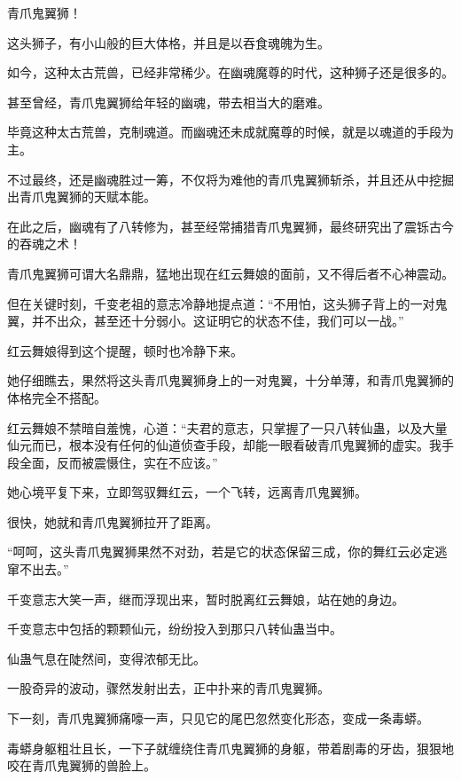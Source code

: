 
\begin{this_body}



青爪鬼翼狮！

这头狮子，有小山般的巨大体格，并且是以吞食魂魄为生。

如今，这种太古荒兽，已经非常稀少。在幽魂魔尊的时代，这种狮子还是很多的。

甚至曾经，青爪鬼翼狮给年轻的幽魂，带去相当大的磨难。

毕竟这种太古荒兽，克制魂道。而幽魂还未成就魔尊的时候，就是以魂道的手段为主。

不过最终，还是幽魂胜过一筹，不仅将为难他的青爪鬼翼狮斩杀，并且还从中挖掘出青爪鬼翼狮的天赋本能。

在此之后，幽魂有了八转修为，甚至经常捕猎青爪鬼翼狮，最终研究出了震铄古今的吞魂之术！

青爪鬼翼狮可谓大名鼎鼎，猛地出现在红云舞娘的面前，又不得后者不心神震动。

但在关键时刻，千变老祖的意志冷静地提点道：“不用怕，这头狮子背上的一对鬼翼，并不出众，甚至还十分弱小。这证明它的状态不佳，我们可以一战。”

红云舞娘得到这个提醒，顿时也冷静下来。

她仔细瞧去，果然将这头青爪鬼翼狮身上的一对鬼翼，十分单薄，和青爪鬼翼狮的体格完全不搭配。

红云舞娘不禁暗自羞愧，心道：“夫君的意志，只掌握了一只八转仙蛊，以及大量仙元而已，根本没有任何的仙道侦查手段，却能一眼看破青爪鬼翼狮的虚实。我手段全面，反而被震慑住，实在不应该。”

她心境平复下来，立即驾驭舞红云，一个飞转，远离青爪鬼翼狮。

很快，她就和青爪鬼翼狮拉开了距离。

“呵呵，这头青爪鬼翼狮果然不对劲，若是它的状态保留三成，你的舞红云必定逃窜不出去。”

千变意志大笑一声，继而浮现出来，暂时脱离红云舞娘，站在她的身边。

千变意志中包括的颗颗仙元，纷纷投入到那只八转仙蛊当中。

仙蛊气息在陡然间，变得浓郁无比。

一股奇异的波动，骤然发射出去，正中扑来的青爪鬼翼狮。

下一刻，青爪鬼翼狮痛嚎一声，只见它的尾巴忽然变化形态，变成一条毒蟒。

毒蟒身躯粗壮且长，一下子就缠绕住青爪鬼翼狮的身躯，带着剧毒的牙齿，狠狠地咬在青爪鬼翼狮的兽脸上。


\end{this_body}
